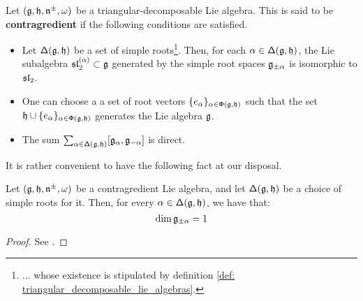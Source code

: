         \begin{definition} \label{def: contragredient_lie_algebras}
            Let $(\g, \h, \n^{\pm}, \omega)$ be a triangular-decomposable Lie algebra. This is said to be \textbf{contragredient} if the following conditions are satisfied.
            \begin{itemize}
                \item Let $\simpleroots(\g, \h)$ be a set of simple roots\footnote{... whose existence is stipulated by definition \ref{def: triangular_decomposable_lie_algebras}.}. Then, for each $\alpha \in \simpleroots(\g, \h)$, the Lie subalgebra $\sl_2^{(\alpha)} \subset \g$ generated by the simple root spaces $\g_{\pm \alpha}$ is isomorphic to $\sl_2$.
                \item One can choose a a set of root vectors $\{ e_{\alpha} \}_{\alpha \in \rootsystem(\g, \h)}$ such that the set $\h \cup \{ e_{\alpha} \}_{\alpha \in \rootsystem(\g, \h)}$ generates the Lie algebra $\g$.
                \item The sum $\sum_{\alpha \in \simpleroots(\g, \h)} [\g_{\alpha}, \g_{-\alpha}]$ is direct.
            \end{itemize}
        \end{definition}
        It is rather convenient to have the following fact at our disposal.
        \begin{lemma} \label{lemma: simple_root_spaces_are_1_dimensional}
            Let $(\g, \h, \n^{\pm}, \omega)$ be a contragredient Lie algebra, and let $\simpleroots(\g, \h)$ be a choice of simple roots for it. Then, for every $\alpha \in \simpleroots(\g, \h)$, we have that:
                $$\dim \g_{\pm \alpha} = 1$$
        \end{lemma}
            \begin{proof}
                See \cite[Section 4.1, p. 311]{moody_pianzola_lie_algebras_with_triangular_decompositions}.
            \end{proof}
